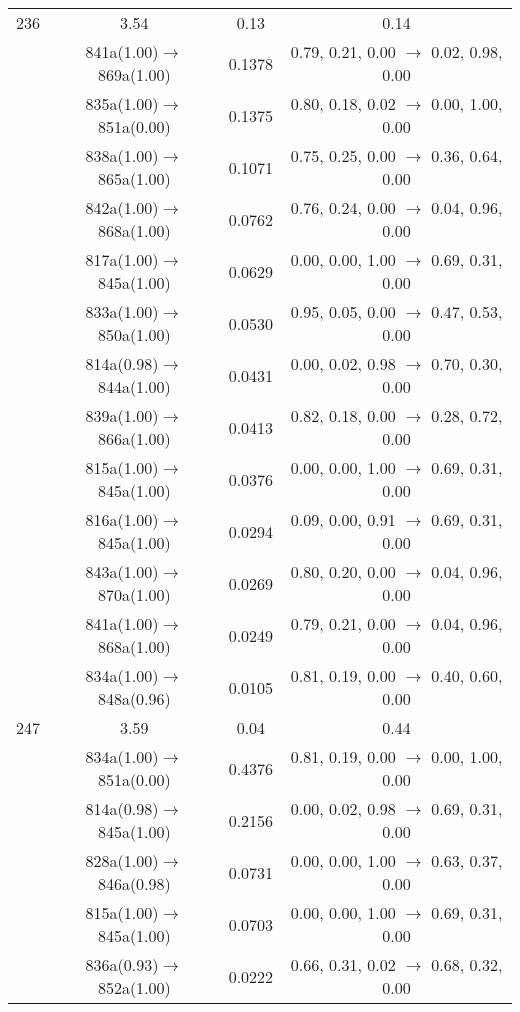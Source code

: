 \documentclass[10pt,a4paper]{article}
\begin{document}
\begin{longtable}{c|c|c|c}
 \hline236 &	 3.54 &	 0.13 &	 0.14 \\ 
  	& 841a(1.00)$\rightarrow$869a(1.00) &	 0.1378 &	 0.79, 0.21, 0.00 $\rightarrow$ 0.02, 0.98, 0.00 \\ 
 	& 835a(1.00)$\rightarrow$851a(0.00) &	 0.1375 &	 0.80, 0.18, 0.02 $\rightarrow$ 0.00, 1.00, 0.00 \\ 
 	& 838a(1.00)$\rightarrow$865a(1.00) &	 0.1071 &	 0.75, 0.25, 0.00 $\rightarrow$ 0.36, 0.64, 0.00 \\ 
 	& 842a(1.00)$\rightarrow$868a(1.00) &	 0.0762 &	 0.76, 0.24, 0.00 $\rightarrow$ 0.04, 0.96, 0.00 \\ 
 	& 817a(1.00)$\rightarrow$845a(1.00) &	 0.0629 &	 0.00, 0.00, 1.00 $\rightarrow$ 0.69, 0.31, 0.00 \\ 
 	& 833a(1.00)$\rightarrow$850a(1.00) &	 0.0530 &	 0.95, 0.05, 0.00 $\rightarrow$ 0.47, 0.53, 0.00 \\ 
 	& 814a(0.98)$\rightarrow$844a(1.00) &	 0.0431 &	 0.00, 0.02, 0.98 $\rightarrow$ 0.70, 0.30, 0.00 \\ 
 	& 839a(1.00)$\rightarrow$866a(1.00) &	 0.0413 &	 0.82, 0.18, 0.00 $\rightarrow$ 0.28, 0.72, 0.00 \\ 
 	& 815a(1.00)$\rightarrow$845a(1.00) &	 0.0376 &	 0.00, 0.00, 1.00 $\rightarrow$ 0.69, 0.31, 0.00 \\ 
 	& 816a(1.00)$\rightarrow$845a(1.00) &	 0.0294 &	 0.09, 0.00, 0.91 $\rightarrow$ 0.69, 0.31, 0.00 \\ 
 	& 843a(1.00)$\rightarrow$870a(1.00) &	 0.0269 &	 0.80, 0.20, 0.00 $\rightarrow$ 0.04, 0.96, 0.00 \\ 
 	& 841a(1.00)$\rightarrow$868a(1.00) &	 0.0249 &	 0.79, 0.21, 0.00 $\rightarrow$ 0.04, 0.96, 0.00 \\ 
 	& 834a(1.00)$\rightarrow$848a(0.96) &	 0.0105 &	 0.81, 0.19, 0.00 $\rightarrow$ 0.40, 0.60, 0.00 \\ 
 \hline247 &	 3.59 &	 0.04 &	 0.44 \\ 
  	& 834a(1.00)$\rightarrow$851a(0.00) &	 0.4376 &	 0.81, 0.19, 0.00 $\rightarrow$ 0.00, 1.00, 0.00 \\ 
 	& 814a(0.98)$\rightarrow$845a(1.00) &	 0.2156 &	 0.00, 0.02, 0.98 $\rightarrow$ 0.69, 0.31, 0.00 \\ 
 	& 828a(1.00)$\rightarrow$846a(0.98) &	 0.0731 &	 0.00, 0.00, 1.00 $\rightarrow$ 0.63, 0.37, 0.00 \\ 
 	& 815a(1.00)$\rightarrow$845a(1.00) &	 0.0703 &	 0.00, 0.00, 1.00 $\rightarrow$ 0.69, 0.31, 0.00 \\ 
 	& 836a(0.93)$\rightarrow$852a(1.00) &	 0.0222 &	 0.66, 0.31, 0.02 $\rightarrow$ 0.68, 0.32, 0.00 \\ 

\end{longtable}
\end{document}
